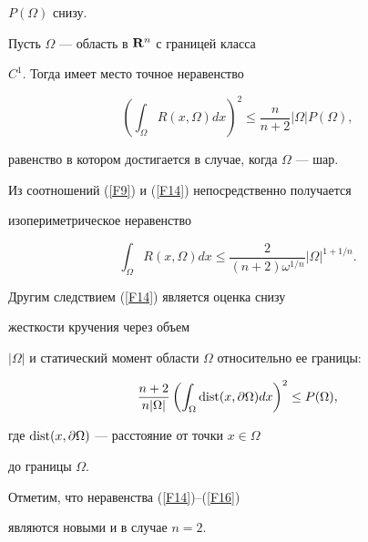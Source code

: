 $P(\Omega)$ снизу.





\begin{thm} \label{T3}


Пусть $\Omega$ --- область в ${\bold R}^n$ с границей класса


$C^1$. Тогда имеет место точное неравенство


\begin{equation} \label{F14}


\left( {\int_\Omega R(x,\Omega)dx} \right)^2


\leq\frac{n}{n+2}|\Omega|P(\Omega),


\end{equation}


равенство в котором достигается в случае, когда $\Omega$ --- шар.


\end{thm}





Из соотношений (\ref{F9}) и (\ref{F14}) непосредственно получается


изопериметрическое неравенство


\begin{equation} \label{F15}


\int_\Omega R(x,\Omega)dx\leq \frac{2}{(n+2)\omega^{1/n}}|\Omega|^{1+1/n}.


\end{equation}


Другим следствием (\ref{F14}) является оценка снизу 


жесткости кручения через объем


$|\Omega|$ и статический момент области $\Omega$ относительно ее границы:


\begin{equation} \label{F16}


\frac{n+2}{n|\Omega|}\left( {\int_\Omega \dist(x,\partial\Omega)dx}


\right)^2\leq P(\Omega),


\end{equation}


где $\operatorname{dist}(x,\partial\Omega)$ --- расстояние от точки $x\in\Omega$ 


до границы $\Omega$.


Отметим, что неравенства (\ref{F14})--(\ref{F16})


являются новыми и в случае $n=2$.





